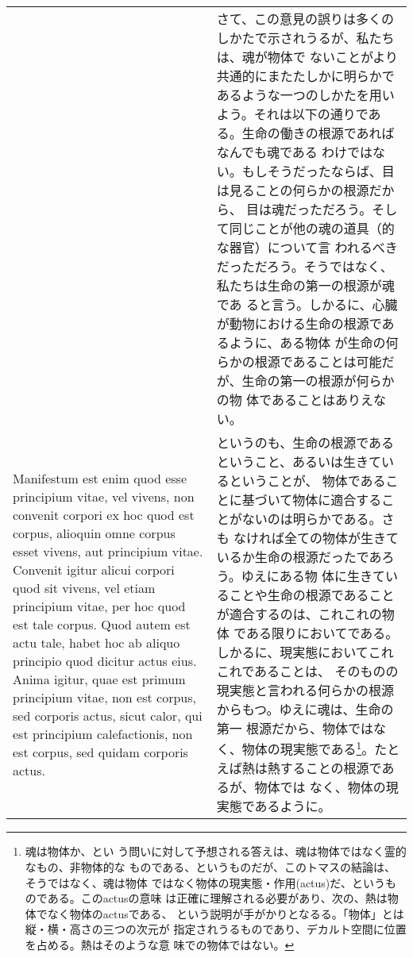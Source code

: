 \documentclass[10pt]{jsarticle} %
\begin{document}
\begin{longtable}{p{21em}p{21em}}
&

さて、この意見の誤りは多くのしかたで示されうるが、私たちは、魂が物体で
ないことがより共通的にまたたしかに明らかであるような一つのしかたを用い
よう。それは以下の通りである。生命の働きの根源であればなんでも魂である
わけではない。もしそうだったならば、目は見ることの何らかの根源だから、
目は魂だっただろう。そして同じことが他の魂の道具（的な器官）について言
われるべきだっただろう。そうではなく、私たちは生命の第一の根源が魂であ
ると言う。しかるに、心臓が動物における生命の根源であるように、ある物体
が生命の何らかの根源であることは可能だが、生命の第一の根源が何らかの物
体であることはありえない。



\\



Manifestum est enim quod esse
principium vitae, vel vivens, non convenit corpori ex hoc quod est
corpus, alioquin omne corpus esset vivens, aut principium
vitae. Convenit igitur alicui corpori quod sit vivens, vel etiam
principium vitae, per hoc quod est tale corpus. Quod autem est actu
tale, habet hoc ab aliquo principio quod dicitur actus eius. Anima
igitur, quae est primum principium vitae, non est corpus, sed corporis
actus, sicut calor, qui est principium calefactionis, non est corpus,
sed quidam corporis actus.


&

というのも、生命の根源であるということ、あるいは生きているということが、
物体であることに基づいて物体に適合することがないのは明らかである。さも
なければ全ての物体が生きているか生命の根源だったであろう。ゆえにある物
体に生きていることや生命の根源であることが適合するのは、これこれの物体
である限りにおいてである。しかるに、現実態においてこれこれであることは、
そのものの現実態と言われる何らかの根源からもつ。ゆえに魂は、生命の第一
根源だから、物体ではなく、物体の現実態である\footnote{魂は物体か、とい
う問いに対して予想される答えは、魂は物体ではなく霊的なもの、非物体的な
ものである、というものだが、このトマスの結論は、そうではなく、魂は物体
ではなく物体の現実態・作用(actus)だ、というものである。このactusの意味
 は正確に理解される必要があり、次の、熱は物体でなく物体のactusである、
 という説明が手がかりとなるる。「物体」とは縦・横・高さの三つの次元が
 指定されうるものであり、デカルト空間に位置を占める。熱はそのような意
 味での物体ではない。}。たとえば熱は熱することの根源であるが、物体では
なく、物体の現実態であるように。



\\




\end{longtable}
\end{document}
